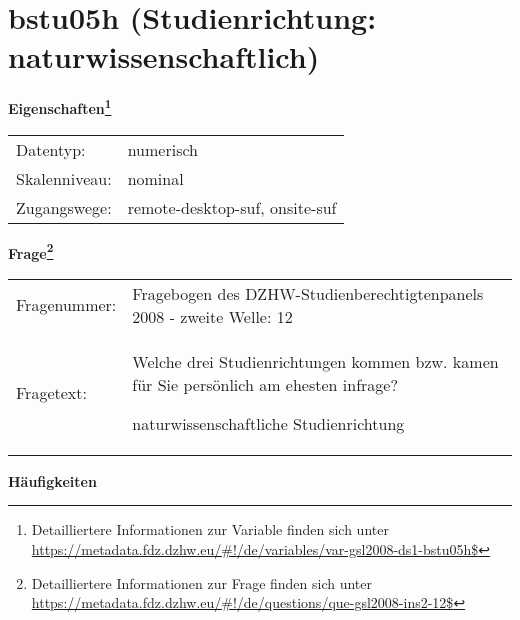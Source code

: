 
    \setcounter{footnote}{0}

    \vspace*{-1.8cm}
	\section{bstu05h (Studienrichtung: naturwissenschaftlich)}
	\label{section:bstu05h}



    \vspace*{0.5cm}
    \noindent\textbf{Eigenschaften\footnote{Detailliertere Informationen zur Variable finden sich unter
		\url{https://metadata.fdz.dzhw.eu/\#!/de/variables/var-gsl2008-ds1-bstu05h$}}}\\
	\begin{tabularx}{\hsize}{@{}lX}
	Datentyp: & numerisch \\
	Skalenniveau: & nominal \\
	Zugangswege: &
	  remote-desktop-suf, 
	  onsite-suf
 \\
    \end{tabularx}



				\vspace*{0.5cm}
                \noindent\textbf{Frage\footnote{Detailliertere Informationen zur Frage finden sich unter
		              \url{https://metadata.fdz.dzhw.eu/\#!/de/questions/que-gsl2008-ins2-12$}}}\\
				\begin{tabularx}{\hsize}{@{}lX}
					Fragenummer: &
					  Fragebogen des DZHW-Studienberechtigtenpanels 2008 - zweite Welle:
					  12
 \\
					Fragetext: & Welche drei Studienrichtungen kommen bzw. kamen für Sie persönlich am ehesten infrage?\par  naturwissenschaftliche Studienrichtung \\
				\end{tabularx}





        		\vspace*{0.5cm}
                \noindent\textbf{Häufigkeiten}

